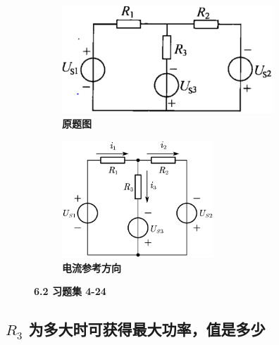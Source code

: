 \documentclass[UTF8]{report}
\theoremstyle{MyLineTheoremStyle} %
\theoremstyle{MyBlockTheoremStyle} %
\theoremstyle{MySubsubsectionStyle} %
\begin{document}
\begin{figure}[H]\centering
\begin{subfigure}[t]{0.55\columnwidth}\centering
    \includegraphics[height=115pt]{assets/6/a45e47a606698b8a935641ad6e1e5ab9.png}
    \caption{\bfseries 原题图 }
\end{subfigure}\hfill
\begin{subfigure}[t]{0.45\columnwidth}\centering
    \includegraphics[height=125pt]{assets/6/0d7f9f1c42f022fbf24925b67ee966d3.png}
    \caption{\bfseries 电流参考方向 }
\end{subfigure}
\caption{\bfseries 6.2 习题集 4-24}\label{6.2 习题集 4-24}
\end{figure}

\subsection{$R_3$ 为多大时可获得最大功率，值是多少}
\end{document}
